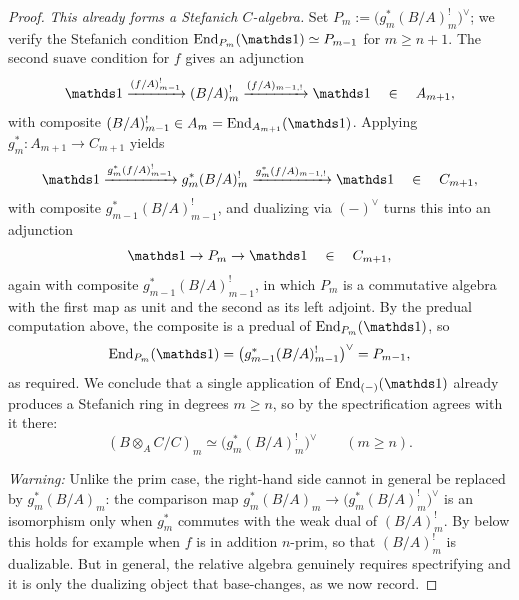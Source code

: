 \documentclass[11pt]{book}
\begin{document}
\begin{proof}
		\emph{This already forms a Stefanich $C$-algebra.} Set $P_m := \bigl(g^*_m(B/A)^!_m\bigr)^\vee$; we verify the Stefanich condition $\End_{P_m}(\unit) \simeq P_{m-1}$ for $m \geq n+1$. The second suave condition for $f$ gives an adjunction
		\[
			\unit \xrightarrow{(f/A)^!_{m-1}} (B/A)^!_m \xrightarrow{(f/A)_{m-1,!}} \unit \qin A_{m+1},
		\]
		with composite $(B/A)^!_{m-1} \in A_m = \End_{A_{m+1}}(\unit)$. Applying $g^*_m\colon A_{m+1} \to C_{m+1}$ yields
		\[
			\unit \xrightarrow{g^*_m(f/A)^!_{m-1}} g^*_m(B/A)^!_m \xrightarrow{g^*_m(f/A)_{m-1,!}} \unit \qin C_{m+1},
		\]
		with composite $g^*_{m-1}(B/A)^!_{m-1}$, and dualizing via $(-)^\vee$ turns this into an adjunction
		\[
			\unit \to P_m \to \unit \qin C_{m+1},
		\]
		again with composite $g^*_{m-1}(B/A)^!_{m-1}$, in which $P_m$ is a commutative algebra with the first map as unit and the second as its left adjoint. By the predual computation above, the composite is a predual of $\End_{P_m}(\unit)$, so
		\[
			\End_{P_m}(\unit) = \bigl(g^*_{m-1}(B/A)^!_{m-1}\bigr)^\vee = P_{m-1},
		\]
		as required. We conclude that a single application of $\End_{(-)}(\unit)$ already produces a Stefanich ring in degrees $m \geq n$, so by  the spectrification agrees with it there:
		\[
			(B \otimes_A C/C)_m \simeq \bigl(g^*_m(B/A)^!_m\bigr)^\vee \qquad (m \geq n).
		\]
		
		\emph{Warning:} Unlike the prim case, the right-hand side cannot in general be replaced by $g^*_m(B/A)_m$: the comparison map $g^*_m(B/A)_m \to \bigl(g^*_m(B/A)^!_m\bigr)^\vee$ is an isomorphism only when $g^*_m$ commutes with the weak dual of $(B/A)^!_m$. By  below this holds for example when $f$ is in addition $n$-prim, so that $(B/A)^!_m$ is dualizable. But in general, the relative algebra genuinely requires spectrifying and it is only the dualizing object that base-changes, as we now record.


\end{proof}
\end{document}
